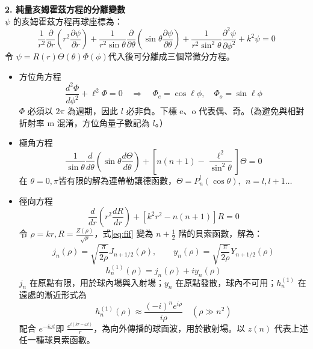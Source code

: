 \textbf{2. 純量亥姆霍茲方程的分離變數}\\
$\psi$ 的亥姆霍茲方程再球座標為：
\begin{equation}
    \frac{1}{r^2} \frac{\partial}{\partial r} \left( r^2 \frac{\partial \psi}{\partial r} \right) + \frac{1}{r^2 \sin\theta} \frac{\partial}{\partial \theta} \left( \sin\theta \frac{\partial \psi}{\partial \theta} \right) + \frac{1}{r^2 \sin^2\theta} \frac{\partial^2 \psi}{\partial \phi^2} + k^2 \psi = 0
\end{equation}
令 $\psi = R\left(r\right) \Theta\left(\theta\right) \Phi \left(\phi\right)$代入後可分離成三個常微分方程。
\begin{itemize}
    \item[(1)] {方位角方程 
        \begin{equation}
            \frac{d^2 \Phi}{d\phi^2} + \ell^2 \Phi = 0 \quad \Rightarrow \quad \Phi_e = \cos\ell\phi, \quad \Phi_o = \sin\ell\phi
        \end{equation}
        $\Phi$ 必須以 $2\pi$ 為週期，因此 $l$ 必非負。下標 e、o 代表偶、奇。（為避免與相對折射率 m 混淆，方位角量子數記為 $l$。）
        } 
    \item[(2)] {極角方程
        \begin{equation}
            \frac{1}{\sin\theta} \frac{d}{d\theta} \left( \sin\theta \frac{d\Theta}{d\theta} \right) + \left[ n(n+1) - \frac{\ell^2}{\sin^2\theta} \right] \Theta = 0
        \end{equation}
        在 $\theta = 0, \pi$皆有限的解為連帶勒讓德函數，\(\Theta = P_{n}^l \left(\cos \theta\right),\ \ n = l, l+1 \dots\)
        }
    \item[(3)] {徑向方程
        \begin{equation}
            \frac{d}{dr} \left( r^2 \frac{dR}{dr} \right) + [k^2 r^2 - n(n+1)]R = 0 \label{eq:fif}
        \end{equation}
        令 $\rho = kr, R = \frac{Z\left(\rho\right)}{\sqrt{\rho}}$，式\eqref{eq:fif} 變為 \(n + \frac{1}{2}\) 階的貝索函數，解為：
        \begin{equation}
            j_n(\rho) = \sqrt{\frac{\pi}{2\rho}} J_{n+1/2}(\rho), \qquad y_n(\rho) = \sqrt{\frac{\pi}{2\rho}} Y_{n+1/2}(\rho)
        \end{equation}
        \begin{equation}
            h_n^{(1)}(\rho) = j_n(\rho) + i y_n(\rho)
        \end{equation}
        $j_n$ 在原點有限，用於球內場與入射場；$y_n$ 在原點發散，球內不可用；$h^{\left(1\right)}_n$ 在遠處的漸近形式為
        \begin{equation}
            h_n^{(1)}(\rho) \approx \frac{(-i)^n e^{i\rho}}{i\rho} \quad (\rho \gg n^2)
        \end{equation}
        配合 $e^{-i\omega t} $即 $\frac{e^{i(kr-\omega t)}}{r}$，為向外傳播的球面波，用於散射場。以 $z\left(n\right)$ 代表上述任一種球貝索函數。
        }
\end{itemize}


